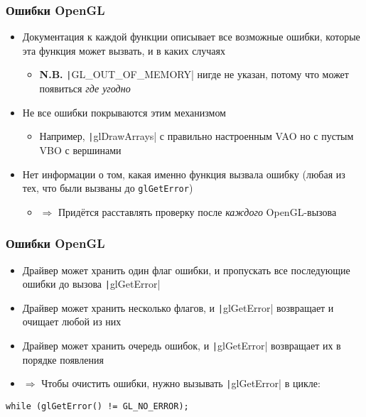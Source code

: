 \documentclass[10pt]{beamer}
\begin{document}
\begin{frame}[fragile]
\frametitle{Ошибки OpenGL}
\begin{itemize}
\item Документация к каждой функции описывает все возможные ошибки, которые эта функция может вызвать, и в каких случаях
\pause
\begin{itemize}
\item \textbf{\alert{N.B.}} \texttt|GL_OUT_OF_MEMORY| нигде не указан, потому что может появиться \textit{где угодно}
\end{itemize}
\pause
\item Не все ошибки покрываются этим механизмом
\pause
\begin{itemize}
\item Например, \texttt|glDrawArrays| с правильно настроенным VAO но с пустым VBO с вершинами
\end{itemize}
\pause
\item Нет информации о том, какая именно функция вызвала ошибку (любая из тех, что были вызваны до \verb|glGetError|)
\pause
\begin{itemize}
\item \begin{math}\Rightarrow\end{math} Придётся расставлять проверку после \textit{каждого} OpenGL-вызова
\end{itemize}
\end{itemize}
\end{frame}

\begin{frame}[fragile]
\frametitle{Ошибки OpenGL}
\begin{itemize}
\item Драйвер может хранить один флаг ошибки, и пропускать все последующие ошибки до вызова \texttt|glGetError|
\pause
\item Драйвер может хранить несколько флагов, и \texttt|glGetError| возвращает и очищает любой из них
\pause
\item Драйвер может хранить очередь ошибок, и \texttt|glGetError| возвращает их в порядке появления
\pause
\item \begin{math}\Longrightarrow\end{math} Чтобы очистить ошибки, нужно вызывать \texttt|glGetError| в цикле:
\end{itemize}
\begin{verbatim}
while (glGetError() != GL_NO_ERROR);
\end{verbatim}
\end{frame}
\end{document}
